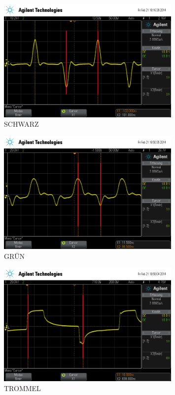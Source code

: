 %
\begin{figure}[]
\centering
\includegraphics[width=0.8\textwidth]{laenge_schwarz.png}
\caption{SCHWARZ}
\label{fig:laenge_schwarz}
\end{figure}
%
\begin{figure}[]
\centering
\includegraphics[width=0.8\textwidth]{laenge_gruen.png}
\caption{GRÜN}
\label{fig:laenge_gruen}
\end{figure}
%
\begin{figure}[]
\centering
\includegraphics[width=0.8\textwidth]{laenge_trommel.png}
\caption{TROMMEL}
\label{fig:laenge_trommel}
\end{figure}
%
\FloatBarrier
%

